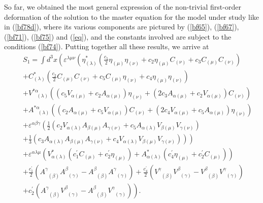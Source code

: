 \documentclass[a4paper,11pt]{article}
\begin{document}
So far, we obtained the most general expression of the non-trivial
first-order deformation of the solution to the master equation for the model
under study like in (\ref{bf78d}), where its various components are pictured
by (\ref{bf65}), (\ref{bf67}), (\ref{bf71}), (\ref{bf75}) and (\ref{eq}),
and the constants involved are subject to the conditions (\ref{bf74}).
Putting together all these results, we arrive at
\begin{eqnarray}
&&S_{1}=\int d^{3}x\left( \varepsilon ^{\lambda \mu \nu }\left( \eta
_{(\lambda )}^{*}\left( \frac{c_{5}}{2}\eta _{(\mu )}\eta _{(\nu
)}+c_{2}\eta _{(\mu )}C_{(\nu )}+c_{3}C_{(\mu )}C_{(\nu )}\right) \right.
\right.  \nonumber \\
&&+C_{(\lambda )}^{*}\left( \frac{c_{2}}{2}C_{(\mu )}C_{(\nu )}+c_{5}C_{(\mu
)}\eta _{(\nu )}+c_{4}\eta _{(\mu )}\eta _{(\nu )}\right)  \nonumber \\
&&+V_{\;\;\;(\lambda )}^{*\alpha }\left( \left( c_{5}V_{\alpha (\mu
)}+c_{2}A_{\alpha (\mu )}\right) \eta _{(\nu )}+\left( 2c_{3}A_{\alpha (\mu
)}+c_{2}V_{\alpha (\mu )}\right) C_{(\nu )}\right)  \nonumber \\
&&+A_{\;\;\;(\lambda )}^{*\alpha }\left( \left( c_{2}A_{\alpha (\mu
)}+c_{5}V_{\alpha (\mu )}\right) C_{(\nu )}+\left( 2c_{4}V_{\alpha (\mu
)}+c_{5}A_{\alpha (\mu )}\right) \eta _{(\nu )}\right)  \nonumber \\
&&+\varepsilon ^{\alpha \beta \gamma }\left( \frac{1}{2}\left(
c_{2}V_{\alpha (\lambda )}A_{\beta (\mu )}A_{\gamma (\nu )}+c_{5}A_{\alpha
(\lambda )}V_{\beta (\mu )}V_{\gamma (\nu )}\right) \right.  \nonumber \\
&&\left. \left. +\frac{1}{3}\left( c_{3}A_{\alpha (\lambda )}A_{\beta (\mu
)}A_{\gamma (\nu )}+c_{4}V_{\alpha (\lambda )}V_{\beta (\mu )}V_{\gamma (\nu
)}\right) \right) \right)  \nonumber \\
&&+\varepsilon ^{\alpha \lambda \mu }\left( V_{\alpha (\lambda )}^{*}\left(
c_{1}^{\prime }C_{(\mu )}+c_{2}^{\prime }\eta _{(\mu )}\right) +A_{\alpha
(\lambda )}^{*}\left( c_{4}^{\prime }\eta _{(\mu )}+c_{2}^{\prime }C_{(\mu
)}\right) \right)  \nonumber \\
&&+\frac{c_{1}^{\prime }}{2}\left( A_{\;\;(\beta )}^{\gamma }A_{\;\;(\gamma
)}^{\beta }-A_{\;\;(\beta )}^{\beta }A_{\;\;(\gamma )}^{\gamma }\right) +%
\frac{c_{4}^{\prime }}{2}\left( V_{\;\;(\beta )}^{\gamma }V_{\;\;(\gamma
)}^{\beta }-V_{\;\;(\beta )}^{\beta }V_{\;\;(\gamma )}^{\gamma }\right)
\nonumber \\
&&\left. +c_{2}^{\prime }\left( A_{\;\;(\beta )}^{\gamma }V_{\;\;(\gamma
)}^{\beta }-A_{\;\;(\beta )}^{\beta }V_{\;\;(\gamma )}^{\gamma }\right)
\right) .  \label{bf79}
\end{eqnarray}
\end{document}
